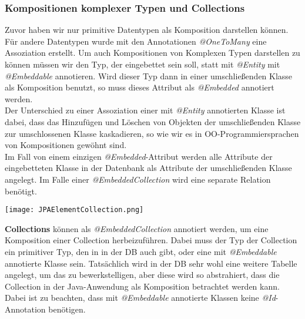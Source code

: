 \subsubsection{Kompositionen komplexer Typen und Collections}
Zuvor haben wir nur primitive Datentypen als Komposition darstellen können. Für andere Datentypen wurde mit den Annotationen \textit{@OneToMany} eine Assoziation erstellt. Um auch Kompositionen von Komplexen Typen darstellen zu können müssen wir den Typ, der eingebettet sein soll, statt mit \textit{@Entity} mit \textit{@Embeddable} annotieren. Wird dieser Typ dann in einer umschließenden Klasse als Komposition benutzt, so muss dieses Attribut als \textit{@Embedded} annotiert werden.\\
Der Unterschied zu einer Assoziation einer mit \textit{@Entity} annotierten Klasse ist dabei, dass das Hinzufügen und Löschen von Objekten der umschließenden Klasse zur umschlossenen Klasse kaskadieren, so wie wir es in OO-Programmiersprachen von Kompositionen gewöhnt sind.\\

Im Fall von einem einzigen \textit{@Embedded}-Attribut werden alle Attribute der eingebetteten Klasse in der Datenbank als Attribute der umschließenden Klasse angelegt. Im Falle einer \textit{@EmbeddedCollection} wird eine separate Relation benötigt.

\texttt{[image: JPAElementCollection.png]}

\textbf{Collections} können als \textit{@EmbeddedCollection} annotiert werden, um eine Komposition einer Collection herbeizuführen. Dabei muss der Typ der Collection ein primitiver Typ, den in in der DB auch gibt, oder eine mit \textit{@Embeddable} annotierte Klasse sein. Tatsächlich wird in der DB sehr wohl eine weitere Tabelle angelegt, um das zu bewerkstelligen, aber diese wird so abstrahiert, dass die Collection in der Java-Anwendung als Komposition betrachtet werden kann. Dabei ist zu beachten, dass mit \textit{@Embeddable} annotierte Klassen keine \textit{@Id}-Annotation benötigen.

